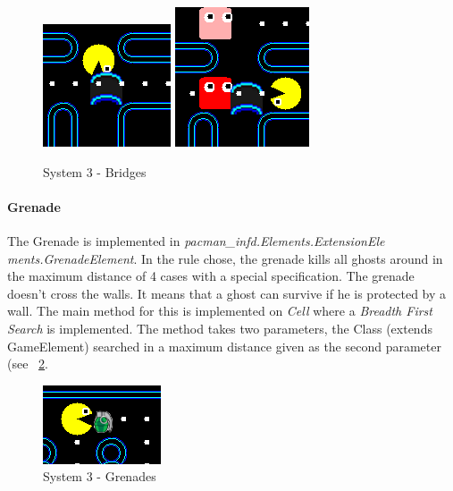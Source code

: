 \documentclass{article}
\begin{document}
\begin{figure}
\centering
    \includegraphics[width=.3\linewidth]{imgs/bridge1.PNG}
    \includegraphics[width=.3\linewidth]{imgs/bridge2.PNG}
    \caption{System 3 - Bridges}
    \label{fig:system3Bridge}
\end{figure}

\paragraph{Grenade} The Grenade is implemented in \textit{pacman\_infd.Elements.ExtensionEle\\ments.GrenadeElement}. In the rule chose, the grenade kills all ghosts around in the maximum distance of 4 cases with a special specification. The grenade doesn't cross the walls. It means that a ghost can survive if he is protected by a wall. The main method for this is implemented on \textit{Cell} where a \textit{Breadth First Search} is implemented. The method takes two parameters, the Class (extends GameElement) searched in a maximum distance given as the second parameter (see ~\ref{fig:system3Grenade}.

\begin{figure}
\centering
    \includegraphics[width=.4\linewidth]{imgs/grenadeBoard.PNG}
    \caption{System 3 - Grenades}
    \label{fig:system3Grenade}
\end{figure}
\end{document}
